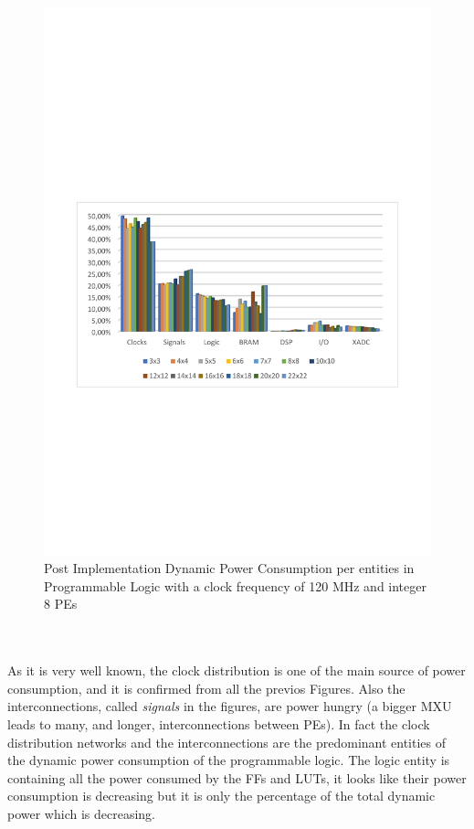 \begin{itemize}
\begin{figure}[!htbp]
\includegraphics[scale=0.7,angle=0]{./figure/graphs/power_pldyn_div_int8_freq_120mhz.pdf}
\caption{Post Implementation Dynamic Power Consumption per entities in Programmable Logic with a clock frequency of 120 MHz and integer 8 PEs}
\label{fig:dynpowint8ent120}
\end{figure}\\\\
As it is very well known, the clock distribution is one of the main source of power consumption, and it is confirmed from all the previos Figures. Also the interconnections, called \textit{signals} in the figures, are power hungry (a bigger MXU leads to many, and longer, interconnections between PEs). In fact the clock distribution networks and the interconnections are the predominant entities of the dynamic power consumption of the programmable logic.
The logic entity is containing all the power consumed by the FFs and LUTs, it looks like their power consumption is decreasing but it is only the percentage of the total dynamic power which is decreasing.

\end{itemize}
